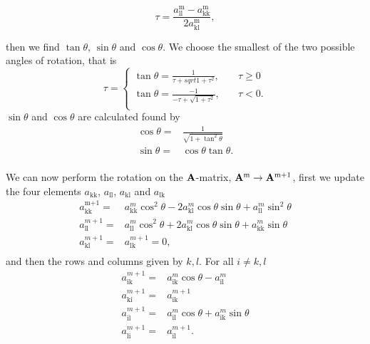 \documentclass[a4paper,10pt,english]{article}
\begin{document}
			\begin{equation}
			\tau = \frac{a_{\text{ll}}^{\text{m}}
			 - a_{\text{kk}}^{\text{m}}}{2a_{\text{kl}}^{\text{m}}},
			\end{equation}

			then we find $\tan \theta$, $\sin \theta$
			and	$\cos \theta$. We choose the
			smallest of the two possible angles of
			rotation, that is
			\begin{equation}
			  \tau = \begin{cases}
				\tan \theta = \frac{1}{\tau + sqrt{1 +
					\tau^2}}, &\quad \tau \geq 0\\
				\tan \theta = \frac{-1}{-\tau + \sqrt{1 +
					\tau^2}}, &\quad \tau < 0. \\
			  \end{cases}
			  \end{equation}
			$\sin \theta$ and $\cos \theta$ are
			calculated found by
			\begin{align}
			  \cos \theta =& \frac{1}{\sqrt{1 + \tan^2\theta}}\\
			  \sin \theta =& \cos \theta \tan \theta.\\
			  \end{align}


			We can now perform the rotation on the  $\bold{A}$-matrix, $\bold{A}^{\text{m}} \rightarrow \bold{A}^{\text{m+1}}$,   first we update the four elements $a_{\text{kk}}$, $a_{\text{ll}}$, $a_{\text{kl}}$ and $a_{\text{lk}}$
			\begin{align}
			  a_{\text{kk}}^{\text{m+1}} =& a_{\text{kk}}^{m}\cos^2\theta - 2 a_{\text{kl}}^{m} \cos \theta \sin \theta + a_{\text{ll}}^{m} \sin^2\theta \\
              a_{\text{ll}}^{m+1} =& a_{\text{ll}}^{m}\cos^2 \theta + 2a_{\text{kl}}^{m}\cos \theta \sin \theta + a_{\text{kk}}^{m}\sin \theta \\
              a_{\text{kl}}^{m+1} =& a_{\text{lk}}^{m+1} = 0,  \\
\end{align}
            and then the rows and columns given by ${k, l}$. For all $i \neq k, l$
\begin{align}
            a_{\text{ik}}^{m+1} =& a_{\text{ik}}^{m}\cos \theta - a_{\text{il}}^{m} \\
            a_{\text{ki}}^{m+1} =& a_{\text{ik}}^{m+1} \\
            a_{\text{il}}^{m+1} =& a_{\text{il}}^{m}\cos \theta + a_{\text{ik}}^{m} \sin\theta \\
            a_{\text{li}}^{m+1} =& a_{\text{il}}^{m+1}.
\end{align}
\end{document}

